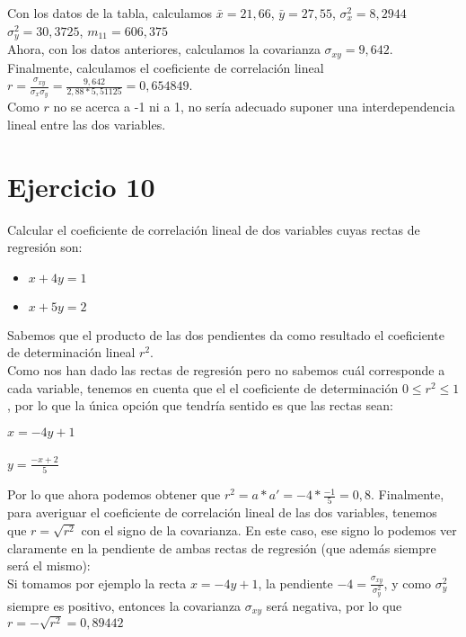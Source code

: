 \documentclass[a4paper,12pt]{article}
\begin{document}
Con los datos de la tabla, calculamos $\bar x =21,66$, $\bar y = 27,55$, $\sigma_x^2= 8,2944$ $\sigma_y^2 = 30,3725$, $m_{11} = 606,375$\\
Ahora, con los datos anteriores, calculamos la covarianza $\sigma_{xy}= 9,642$.\\
Finalmente, calculamos el coeficiente de correlación lineal $r=\frac{\sigma_{xy}}{\sigma_x\sigma_y} = \frac {9,642}{2,88*5,51125} = 0,654849$.\\
Como $r$ no se acerca a -1 ni a 1, no sería adecuado suponer una interdependencia lineal entre las dos variables.

\section*{Ejercicio 10}
Calcular el coeficiente de correlación lineal de dos variables cuyas rectas de regresión son:

\begin{itemize}
    \item $x + 4y = 1$
    \item $x + 5y = 2$
\end{itemize}

Sabemos que el producto de las dos pendientes da como resultado el coeficiente de determinación lineal $r^2$.\\
Como nos han dado las rectas de regresión pero no sabemos cuál corresponde a cada variable, tenemos en cuenta que el el coeficiente de determinación $0\leq r^2 \leq 1$, por lo que la única opción que tendría sentido es que las rectas sean:

\begin{itemize}
    $x=-4y+1$\\
    
    \\$y=\frac{-x+2}{5}$\\
\end{itemize}

Por lo que ahora podemos obtener que $r^2=a*a' = -4 * \frac{-1}{5}=0,8$.
Finalmente, para averiguar el coeficiente de correlación lineal de las dos variables, tenemos que $r=\sqrt{r^2}$ con el signo de la covarianza. En este caso, ese signo lo podemos ver claramente en la pendiente de ambas rectas de regresión (que además siempre será el mismo):\\
Si tomamos por ejemplo la recta  $x=-4y+1$, la pendiente $-4=\frac{\sigma_{xy}}{\sigma^2_{y}}$, y como $\sigma^2_{y}$ siempre es positivo, entonces la covarianza $\sigma_{xy}$ será negativa, por lo que $r=-\sqrt{r^2}=0,89442$
\end{document}
